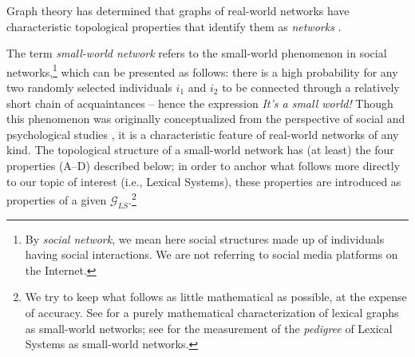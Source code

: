 \begin{soundboxnotitle}
Graph theory has determined that graphs of real-world networks have characteristic topological properties that identify them as  \mbox{\textit{networks}} \parencite{WattsStrogatz1998}.
\end{soundboxnotitle}

The term \emph{small-world network} refers to the small-world phenomenon in social networks,\footnote{By \textit{social network}, we mean here social structures made up of individuals having social interactions. We are not referring to social media platforms on the Internet.} which can be presented as follows: there is a high probability for any two randomly selected individuals $i_1$ and $i_2$ to be connected through a relatively short chain of acquaintances \parencite[163]{Kleinberg2000} -- hence the expression \textit{It's a small world!} Though this phenomenon was originally conceptualized from the perspective of social and psychological studies \parencite{Milgram1967}, it is a characteristic feature of real-world networks of any kind. The topological structure of a small-world network has (at least) the four properties (A--D) described below; in order to anchor what follows more directly to our topic of interest (i.e., Lexical Systems), these properties are introduced as properties of a given $\mathcal{G}_{LS}$.\footnote{We try to keep what follows as little mathematical as possible, at the expense of accuracy. See \textcite{GaumeEtAl2010} for a purely mathematical characterization of lexical graphs as small-world networks; see \textcite[Sec.~3]{GaderEtAl2014a-e} for the measurement of the \textit{pedigree} of Lexical Systems as small-world networks.}

